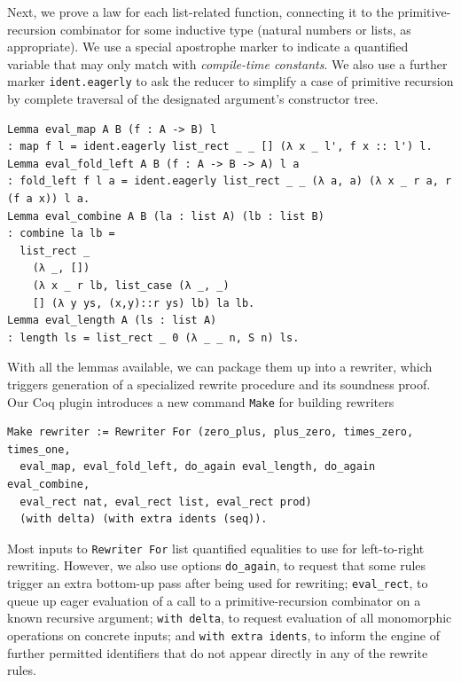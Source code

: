 Next, we prove a law for each list-related function, connecting it to the primitive-recursion combinator for some inductive type (natural numbers or lists, as appropriate).
We use a special apostrophe marker to indicate a quantified variable that may only match with \emph{compile-time constants}.
We also use a further marker \texttt{ident.eagerly} to ask the reducer to simplify a case of primitive recursion by complete traversal of the designated argument's constructor tree.
\begin{verbatim}
Lemma eval_map A B (f : A -> B) l
: map f l = ident.eagerly list_rect _ _ [] (λ x _ l', f x :: l') l.
Lemma eval_fold_left A B (f : A -> B -> A) l a
: fold_left f l a = ident.eagerly list_rect _ _ (λ a, a) (λ x _ r a, r (f a x)) l a.
Lemma eval_combine A B (la : list A) (lb : list B)
: combine la lb =
  list_rect _
    (λ _, [])
    (λ x _ r lb, list_case (λ _, _)
    [] (λ y ys, (x,y)::r ys) lb) la lb.
Lemma eval_length A (ls : list A)
: length ls = list_rect _ 0 (λ _ _ n, S n) ls.
\end{verbatim}

With all the lemmas available, we can package them up into a rewriter, which triggers generation of a specialized rewrite procedure and its soundness proof.
Our Coq plugin introduces a new command \texttt{Make} for building rewriters
\begin{verbatim}
Make rewriter := Rewriter For (zero_plus, plus_zero, times_zero, times_one,
  eval_map, eval_fold_left, do_again eval_length, do_again eval_combine,
  eval_rect nat, eval_rect list, eval_rect prod)
  (with delta) (with extra idents (seq)).
\end{verbatim}
Most inputs to \texttt{Rewriter For} list quantified equalities to use for left-to-right rewriting.
However, we also use options \texttt{do_again}, to request that some rules trigger an extra bottom-up pass after being used for rewriting; \texttt{eval_rect}, to queue up eager evaluation of a call to a primitive-recursion combinator on a known recursive argument; \texttt{with delta}, to request evaluation of all monomorphic operations on concrete inputs; and \texttt{with extra idents}, to inform the engine of further permitted identifiers that do not appear directly in any of the rewrite rules.

